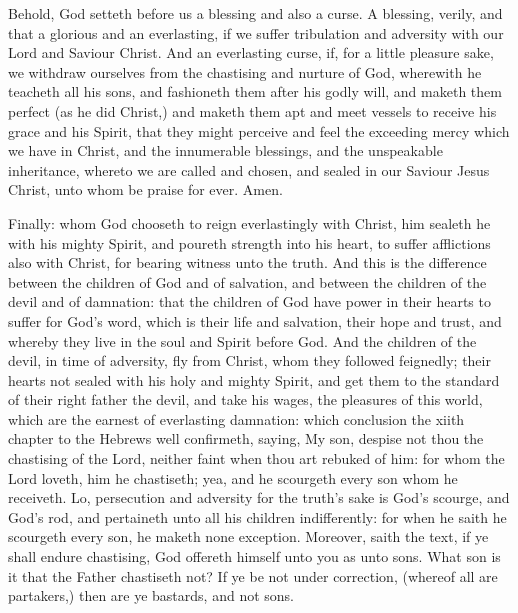 Behold, God setteth before us a blessing and 
also a curse. A blessing, verily, and that a 
glorious and an everlasting, if we suffer tribulation
and adversity with our Lord and Saviour 
Christ. And an everlasting curse, if, for a little 
pleasure sake, we withdraw ourselves from the 
chastising and nurture of God, wherewith he 
teacheth all his sons, and fashioneth them after 
his godly will, and maketh them perfect (as he 
did Christ,) and maketh them apt and meet 
vessels to receive his grace and his Spirit, that 
they might perceive and feel the exceeding 
mercy which we have in Christ, and the innumerable
blessings, and the unspeakable inheritance,
whereto we are called and chosen, and 
sealed in our Saviour Jesus Christ, unto whom 
be praise for ever. Amen. 

Finally: whom God chooseth to reign everlastingly
with Christ, him sealeth he with his 
mighty Spirit, and poureth strength into his 
heart, to suffer afflictions also with Christ, for 
bearing witness unto the truth. And this is the 
difference between the children of God and of 
salvation, and between the children of the devil 
and of damnation: that the children of God
have power in their hearts to suffer for God's 
word, which is their life and salvation, their 
hope and trust, and whereby they live in 
the soul and Spirit before God. And the 
children of the devil, in time of adversity, 
fly from Christ, whom they followed feignedly; 
their hearts not sealed with his holy and mighty 
Spirit, and get them to the standard of their 
right father the devil, and take his wages, the
pleasures of this world, which are the earnest of
everlasting damnation: which conclusion the 
xiith chapter to the Hebrews well confirmeth, 
saying, My son, despise not thou the chastising of 
the Lord, neither faint when thou art rebuked of 
him: for whom the Lord loveth, him he chastiseth;
yea, and he scourgeth every son whom
he receiveth. Lo, persecution and adversity for
the truth's sake is God's scourge, and God's rod, 
and pertaineth unto all his children indifferently:
for when he saith he scourgeth every son, he 
maketh none exception. Moreover, saith the 
text, if ye shall endure chastising, God offereth 
himself unto you as unto sons. What son is it 
that the Father chastiseth not? If ye be not 
under correction, (whereof all are partakers,) 
then are ye bastards, and not sons. 

